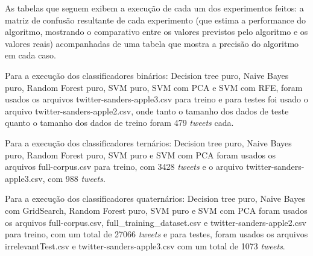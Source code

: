 As tabelas que seguem exibem a execução de cada um dos experimentos feitos: a matriz de confusão resultante de cada experimento (que estima a performance do algoritmo, mostrando o comparativo entre os valores previstos pelo algoritmo e os valores reais) acompanhadas de uma tabela que mostra a precisão do algoritmo em cada caso.

Para a execução dos classificadores binários:  Decision tree puro, Naive Bayes puro, Random Forest puro, SVM puro, SVM com PCA e SVM com RFE, foram usados os arquivos twitter-sanders-apple3.csv para treino e para testes foi usado o arquivo twitter-sanders-apple2.csv, onde tanto o tamanho dos dados de teste quanto o tamanho dos dados de treino foram 479 \emph{tweets} cada.

Para a execução dos classificadores ternários: Decision tree puro, Naive Bayes puro, Random Forest puro, SVM puro e SVM com PCA foram usados os arquivos full-corpus.csv para treino, com 3428 \emph{tweets} e o arquivo twitter-sanders-apple3.csv, com 988 \emph{tweets}.

Para a execução dos classificadores quaternários: Decision tree puro, Naive Bayes com GridSearch, Random Forest puro, SVM puro e SVM com PCA foram usados os arquivos full-corpus.csv, full\_training\_dataset.csv e twitter-sanders-apple2.csv para treino, com um total de 27066 \emph{tweets} e para testes, foram usados os arquivos irrelevantTest.csv e twitter-sanders-apple3.csv com um total de 1073 \emph{tweets}.



